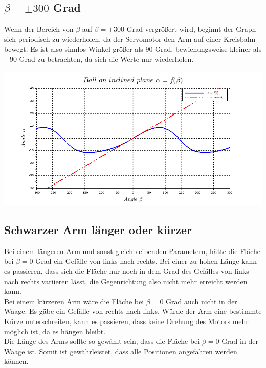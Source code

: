 \subsection{$\beta = \pm 300$ Grad}
Wenn der Bereich von $\beta$ auf $\beta=\pm300$ Grad vergrößert wird, beginnt der Graph sich periodisch zu wiederholen, da der Servomotor den Arm auf einer Kreisbahn bewegt. Es ist also sinnlos Winkel größer als $90$ Grad, bewiehungsweise kleiner als $-90$ Grad zu betrachten, da sich die Werte nur wiederholen. \\
\begin{center}
	\begin{minipage}{\linewidth}
	\centering
	\includegraphics[scale=0.45]{images/plot2_1.png}
	\end{minipage}
\end{center}

\subsection{Schwarzer Arm länger oder kürzer}
Bei einem längeren Arm und sonst gleichbleibenden Parametern, hätte die Fläche bei $\beta = 0$ Grad ein Gefälle von links nach rechts. Bei einer zu hohen Länge kann es passieren, dass sich die Fläche nur noch in dem Grad des Gefälles von links nach rechts variieren lässt, die Gegenrichtung also nicht mehr erreicht werden kann. \\
Bei einem kürzeren Arm wäre die Fläche bei $\beta = 0$ Grad auch nicht in der Waage. Es gäbe ein Gefälle von rechts nach links. Würde der Arm eine bestimmte Kürze unterschreiten, kann es passieren, dass keine Drehung des Motors mehr möglich ist, da es hängen bleibt. \\
Die Länge des Arms sollte so gewählt sein, dass die Fläche bei $\beta = 0$ Grad in der Waage ist. Somit ist gewährleistet, dass alle Positionen angefahren werden können.